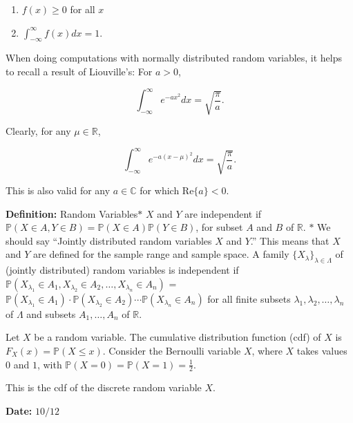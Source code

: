 \documentclass[12pt]{article}
\newcommand{\R}{\mathbb{R}}
\newcommand{\prob}[1]{\mathbb{P}(#1)}
\newcommand{\nspace}{\vspace*{.5cm}}
\begin{document}
\begin{enumerate}[label=(\roman*)]
\item $f(x) \geq 0$ for all $x$
\item $\int_{- \infty}^{\infty} f(x) dx = 1$.
\end{enumerate}

\noindent
When doing computations with normally distributed random variables, it helps to recall a result of Liouville's: For $a > 0$, 

\begin{equation*}
\int_{- \infty}^{\infty} e^{-ax^2} dx = \sqrt{\frac{\pi}{a}}.
\end{equation*}

\noindent
Clearly, for any $\mu \in \R$, 

\begin{equation*}
\int_{- \infty}^{\infty} e^{-a(x - \mu)^2} dx = \sqrt{\frac{\pi}{a}}.
\end{equation*}

\noindent
This is also valid for any $a \in \mathbb{C}$ for which Re$\{a\} < 0$. 

\nspace
\noindent
\textbf{Definition:} Random Variables$*$ $X$ and $Y$ are independent if $\prob{X \in A, Y \in B} = \prob{X \in A} \prob{Y \in B}$, for subset $A$ and $B$ of $\R$. $*$ We should say ``Jointly distributed random variables $X$ and $Y$.'' This means that $X$ and $Y$ are defined for the sample range and sample space. A family $\{ X_\lambda \}_{\lambda \in \Lambda}$ of (jointly distributed) random variables is independent if $\prob{X_{\lambda_1} \in A_1, X_{\lambda_2} \in A_2, \ldots, X_{\lambda_n} \in A_n }$ = $\prob{X_{\lambda_1} \in A_1} \cdot  \prob{X_{\lambda_2} \in A_2} \cdots \prob{X_{\lambda_n} \in A_n} $ for all finite subsets $\lambda_1, \lambda_2, \ldots, \lambda_n$ of $\Lambda$ and subsets $A_1, \ldots, A_n$ of $\R$.

\nspace
\noindent
Let $X$ be a random variable. The cumulative distribution function (cdf) of $X$ is $F_X(x) = \prob{X \leq x}$. Consider the Bernoulli variable $X$, where $X$ takes values $0$ and $1$, with $\prob{X = 0} = \prob{X = 1} = \frac{1}{2}$. 


\noindent
This is the cdf of the discrete random variable $X$.

\begin{flushright}
\textbf{Date:} $10/12$
\end{flushright}
\end{document}
